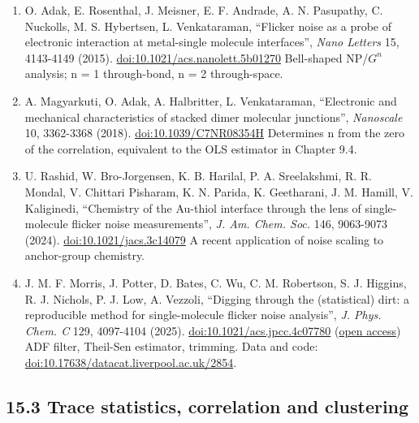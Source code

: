 \documentclass[
  11pt,
  a4paper,
]{article}
\providecommand{\tightlist}{%
  \setlength{\itemsep}{0pt}\setlength{\parskip}{0pt}}
\begin{document}
\begin{enumerate}
\def\labelenumi{\arabic{enumi}.}
\setcounter{enumi}{6}
\tightlist
\item
  O. Adak, E. Rosenthal, J. Meisner, E. F. Andrade, A. N. Pasupathy, C.
  Nuckolls, M. S. Hybertsen, L. Venkataraman, ``Flicker noise as a probe
  of electronic interaction at metal-single molecule interfaces'',
  \emph{Nano Letters} 15, 4143-4149 (2015).
  \href{https://doi.org/10.1021/acs.nanolett.5b01270}{doi:10.1021/acs.nanolett.5b01270}
  Bell-shaped NP/$G^{n}$ analysis; n = 1 through-bond, n = 2
  through-space.
\item
  A. Magyarkuti, O. Adak, A. Halbritter, L. Venkataraman, ``Electronic
  and mechanical characteristics of stacked dimer molecular junctions'',
  \emph{Nanoscale} 10, 3362-3368 (2018).
  \href{https://doi.org/10.1039/C7NR08354H}{doi:10.1039/C7NR08354H}
  Determines n from the zero of the correlation, equivalent to the OLS
  estimator in Chapter 9.4.
\item
  U. Rashid, W. Bro-Jorgensen, K. B. Harilal, P. A. Sreelakshmi, R. R.
  Mondal, V. Chittari Pisharam, K. N. Parida, K. Geetharani, J. M.
  Hamill, V. Kaliginedi, ``Chemistry of the Au-thiol interface through
  the lens of single-molecule flicker noise measurements'', \emph{J. Am.
  Chem. Soc.} 146, 9063-9073 (2024).
  \href{https://doi.org/10.1021/jacs.3c14079}{doi:10.1021/jacs.3c14079}
  A recent application of noise scaling to anchor-group chemistry.
\item
  J. M. F. Morris, J. Potter, D. Bates, C. Wu, C. M. Robertson, S. J.
  Higgins, R. J. Nichols, P. J. Low, A. Vezzoli, ``Digging through the
  (statistical) dirt: a reproducible method for single-molecule flicker
  noise analysis'', \emph{J. Phys. Chem. C} 129, 4097-4104 (2025).
  \href{https://doi.org/10.1021/acs.jpcc.4c07780}{doi:10.1021/acs.jpcc.4c07780}
  (\href{https://pmc.ncbi.nlm.nih.gov/articles/PMC11874016/}{open
  access}) ADF filter, Theil-Sen estimator, trimming. Data and code:
  \href{https://doi.org/10.17638/datacat.liverpool.ac.uk/2854}{doi:10.17638/datacat.liverpool.ac.uk/2854}.
\end{enumerate}

\hypertarget{trace-statistics-correlation-and-clustering}{%
\subsection{15.3 Trace statistics, correlation and
clustering}\label{trace-statistics-correlation-and-clustering}}
\end{document}
